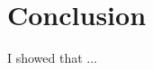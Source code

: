 \documentclass[thesis.tex]{subfiles}
\begin{document}
\chapter{Conclusion}

I showed that ...

\biblio
\end{document}
